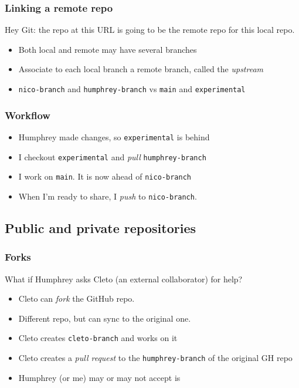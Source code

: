 \documentclass{beamer}
\begin{document}
\begin{frame}[fragile]
    \frametitle{Linking a remote repo}
    Hey Git: the repo at this URL is going to be the remote repo for this local repo.
    \begin{itemize}
        \item Both local and remote may have several branches
        \item Associate to each local branch a remote branch, called the \textit{upstream}
        \item \verb|nico-branch| and \verb|humphrey-branch| vs \verb|main| and \verb|experimental|
    \end{itemize}
\end{frame}
        
\begin{frame}[fragile]
    \frametitle{Workflow}
    \begin{itemize}
        \item Humphrey made changes, so \verb|experimental| is behind
        \item I checkout \verb|experimental| and \textit{pull} \verb|humphrey-branch|
        \item I work on \verb|main|. It is now ahead of \verb|nico-branch|
        \item When I'm ready to share, I \textit{push} to \verb|nico-branch|.
    \end{itemize}
\end{frame} 

\subsection{Public and private repositories}

\begin{frame}[fragile]
    \frametitle{Forks}
    What if Humphrey asks Cleto (an external collaborator) for help? 

    \begin{itemize}
        \item Cleto can \textit{fork} the GitHub repo. 
        \item Different repo, but can sync to the original one. 
        \item Cleto creates \verb|cleto-branch| and works on it
        \item Cleto creates a \textit{pull request} to the \verb|humphrey-branch| of the original GH repo
        \item Humphrey (or me) may or may not accept is
    \end{itemize}
\end{frame}
\end{document}
